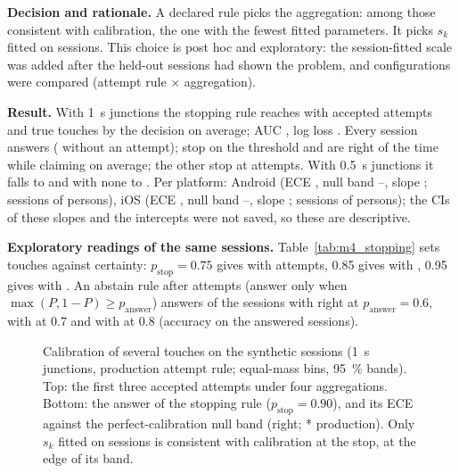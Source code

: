 \textbf{Decision and rationale.}
A declared rule picks the aggregation: among those consistent with calibration, the one with the fewest fitted parameters.
It picks $s_k$ fitted on sessions.
This choice is post hoc and exploratory: the session-fitted scale was added after the held-out sessions had shown the problem, and  configurations were compared (attempt rule $\times$ aggregation).

\textbf{Result.}
With 1~s junctions the stopping rule reaches  with  accepted attempts and  true touches by the decision on average; AUC , log loss .
Every session answers ( without an attempt);  stop on the threshold and are right  of the time while claiming  on average; the other  stop at  attempts.
With 0.5~s junctions it falls to  and with none to .
Per platform: Android  (ECE , null band --, slope ;  sessions of  persons), iOS  (ECE , null band --, slope ;  sessions of  persons); the CIs of these slopes and the intercepts were not saved, so these are descriptive.

\textbf{Exploratory readings of the same sessions.}
Table~\ref{tab:m4_stopping} sets touches against certainty: $p_{\mathrm{stop}} = 0.75$ gives  with  attempts, 0.85 gives  with , 0.95 gives  with .
An abstain rule after  attempts (answer only when $\max(P, 1-P) \ge p_{\mathrm{answer}}$) answers  of the sessions with  right at $p_{\mathrm{answer}} = 0.6$,  with  at 0.7 and  with  at 0.8 (accuracy on the answered sessions).

\begin{figure}[htbp]
  \centering
  \caption{Calibration of several touches on the synthetic sessions (1~s junctions, production attempt rule; equal-mass bins, 95~\% bands). Top: the first three accepted attempts under four aggregations. Bottom: the answer of the stopping rule ($p_{\mathrm{stop}} = 0.90$), and its ECE against the perfect-calibration null band (right; * production). Only $s_k$ fitted on sessions is consistent with calibration at the stop, at the edge of its band.}
  \label{fig:M4_06_k3_calibration}\label{fig:app:prod-k3cal}
\end{figure}
\FloatBarrier


